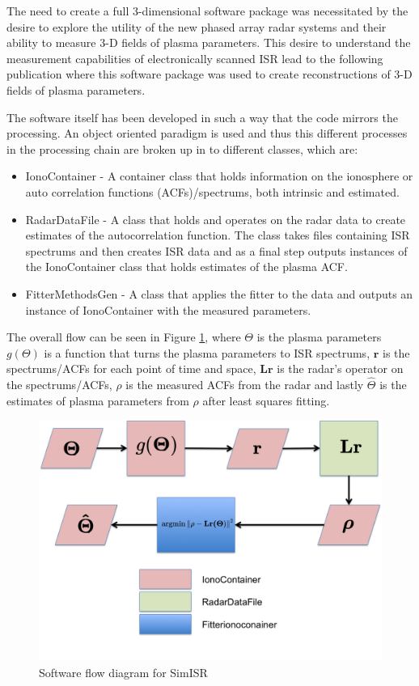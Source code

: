 The need to create a full 3-dimensional software package was necessitated by the desire to explore the utility of the new phased array radar systems and their ability to measure 3-D fields of plasma parameters. This desire to understand the measurement capabilities of electronically scanned ISR lead to the following publication \cite{RDS:RDS20236} where this software package was used to create reconstructions of 3-D fields of plasma parameters.

The software itself has been developed in such a way that the code mirrors the processing. An object oriented paradigm is used and thus this different processes in the processing chain are broken up in to different classes, which are: 

\begin{itemize} 
\item IonoContainer - A container class that holds information on the ionosphere or auto correlation functions (ACFs)/spectrums, both intrinsic and estimated.

\item RadarDataFile - A class that holds and operates on the radar data to create estimates of the autocorrelation function. The class takes files containing ISR spectrums and then creates ISR data and as a final step outputs instances of the IonoContainer class that holds estimates of the plasma ACF.

\item FitterMethodsGen - A class that applies the fitter to the data and outputs an instance of IonoContainer with the measured parameters. 
\end{itemize}

The overall flow can be seen in Figure \ref{fig:swflow}, where  $\Theta$ is the plasma parameters $ g(\Theta)$ is a function that turns the plasma parameters to ISR spectrums, $ \mathbf{r}$ is the spectrums/ACFs for each point of time and space, $ \mathbf{Lr}$ is the radar's operator on the spectrums/ACFs, $ \rho$ is the measured ACFs from the radar and lastly $ \hat{\Theta}$ is the estimates of plasma parameters from $ \rho$ after least squares fitting.

\begin{figure}[h!]
\centering
\includegraphics[width=6.0in]{softwareflowandmath}
\caption{Software flow diagram for SimISR}
\label{fig:swflow}
\end{figure}


